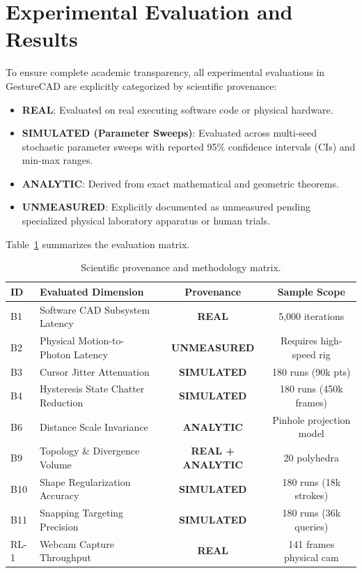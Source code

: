 \section{Experimental Evaluation and Results}
\label{sec:experiments}

To ensure complete academic transparency, all experimental evaluations in GestureCAD are explicitly categorized by scientific provenance:
\begin{itemize}
    \item \textbf{REAL}: Evaluated on real executing software code or physical hardware.
    \item \textbf{SIMULATED (Parameter Sweeps)}: Evaluated across multi-seed stochastic parameter sweeps with reported 95\% confidence intervals (CIs) and min-max ranges.
    \item \textbf{ANALYTIC}: Derived from exact mathematical and geometric theorems.
    \item \textbf{UNMEASURED}: Explicitly documented as unmeasured pending specialized physical laboratory apparatus or human trials.
\end{itemize}
Table~\ref{tab:provenance} summarizes the evaluation matrix.

\begin{table}[t]
\caption{Scientific provenance and methodology matrix.}
\label{tab:provenance}
\centering
\small
\begin{tabular}{llcc}
\toprule
\textbf{ID} & \textbf{Evaluated Dimension} & \textbf{Provenance} & \textbf{Sample Scope} \\
\midrule
B1 & Software CAD Subsystem Latency & \textbf{REAL} & 5,000 iterations \\
B2 & Physical Motion-to-Photon Latency & \textbf{UNMEASURED} & Requires high-speed rig \\
B3 & Cursor Jitter Attenuation & \textbf{SIMULATED} & 180 runs (90k pts) \\
B4 & Hysteresis State Chatter Reduction & \textbf{SIMULATED} & 180 runs (450k frames) \\
B6 & Distance Scale Invariance & \textbf{ANALYTIC} & Pinhole projection model \\
B9 & Topology \& Divergence Volume & \textbf{REAL + ANALYTIC} & 20 polyhedra \\
B10 & Shape Regularization Accuracy & \textbf{SIMULATED} & 180 runs (18k strokes) \\
B11 & Snapping Targeting Precision & \textbf{SIMULATED} & 180 runs (36k queries) \\
RL-1 & Webcam Capture Throughput & \textbf{REAL} & 141 frames physical cam \\
\bottomrule
\end{tabular}
\end{table}

